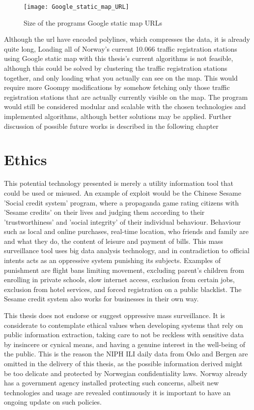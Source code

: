 \begin{figure}[!htb]
\texttt{[image: Google\_static\_map\_URL]}
\centering
\caption{Size of the programs Google static map URLs}
\label{fig:google_url}
\end{figure}

Although the url have encoded polylines, which compresses the data, it is already quite long, Loading all of Norway's current 10.066 traffic registration stations using Google static map with this thesis's current algorithms is not feasible, although this could be solved by clustering the traffic registration stations together, and only loading what you actually can see on the map. This would require more Goompy modifications by somehow fetching only those traffic registration stations that are actually currently visible on the map.
The program would still be considered modular and scalable with the chosen technologies and implemented algorithms, although better solutions may be applied. Further discussion of possible future works is described in the following chapter




\section{Ethics}
This potential technology presented is merely a utility information tool that could be used or misused. An example of exploit would be the Chinese Sesame 'Social credit system' program\cite{meissner2017china}\cite{china_botsman}\cite{china_wiki}, where a propaganda game rating citizens with 'Sesame credits' on their lives and judging them according to their 'trustworthiness' and 'social integrity' of their individual behaviour. Behaviour such as local and online purchases, real-time location, who friends and family are and what they do, the content of leisure and payment of bills. This mass surveillance tool uses big data analysis technology, and in contradiction to official intents acts as an oppressive system punishing its subjects. Examples of punishment are flight bans limiting movement, excluding parent's children from enrolling in private schools, slow internet access, exclusion from certain jobs, exclusion from hotel services, and forced registration on a public blacklist. The Sesame credit system also works for businesses in their own way.

This thesis does not endorse or suggest oppressive mass surveillance. It is considerate to contemplate ethical values when developing systems that rely on public information extraction, taking care to not be reckless with sensitive data by insincere or cynical means, and having a genuine interest in the well-being of the public. This is the reason the NIPH ILI daily data from Oslo and Bergen are omitted in the delivery of this thesis, as the possible information derived might be too delicate and protected by Norwegian confidentiality laws. Norway already has a government agency installed protecting such concerns\cite{datatilsynet}, albeit new technologies and usage are revealed continuously it is important to have an ongoing update on such policies.






